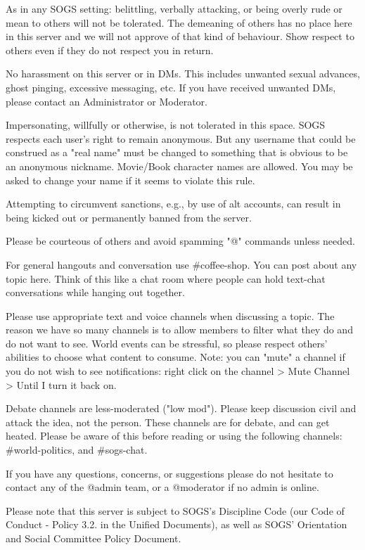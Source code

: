 \begin{longenum}[ label*=\thesubsection.\arabic*., align=left]
\begin{longenum}[label*=\arabic*., align=left]
			\item As in any SOGS setting: belittling, verbally attacking, or being overly rude or mean to others will not be tolerated. The demeaning of others has no place here in this server and we will not approve of that kind of behaviour. Show respect to others even if they do not respect you in return.
			\item No harassment on this server or in DMs. This includes unwanted sexual advances, ghost pinging, excessive messaging, etc. If you have received unwanted DMs, please contact an Administrator or Moderator.
			\item Impersonating, willfully or otherwise, is not tolerated in this space. SOGS respects each user's right to remain anonymous. But any username that could be construed as a "real name" must be changed to something that is obvious to be an anonymous nickname. Movie/Book character names are allowed. You may be asked to change your name if it seems to violate this rule.
			\item Attempting to circumvent sanctions, e.g., by use of alt accounts, can result in being kicked out or permanently banned from the server.
			\item Please be courteous of others and avoid spamming "@" commands unless needed.
			\item For general hangouts and conversation use \#coffee-shop. You can post about any topic here. Think of this like a chat room where people can hold text-chat conversations while hanging out together.
			\item Please use appropriate text and voice channels when discussing a topic. The reason we have so many channels is to allow members to filter what they do and do not want to see. World events can be stressful, so please respect others' abilities to choose what content to consume. Note: you can "mute" a channel if you do not wish to see notifications: right click on the channel > Mute Channel > Until I turn it back on.
			\item Debate channels are less-moderated ("low mod"). Please keep discussion civil and attack the idea, not the person. These channels are for debate, and can get heated. Please be aware of this before reading or using the following channels: \#world-politics, and \#sogs-chat.
			\item If you have any questions, concerns, or suggestions please do not hesitate to contact any of the @admin team, or a @moderator if no admin is online.
			\item Please note that this server is subject to SOGS's Discipline Code (our Code of Conduct - Policy 3.2. in the Unified Documents), as well as SOGS' Orientation and Social Committee Policy Document.			

\end{longenum}
\end{longenum}

